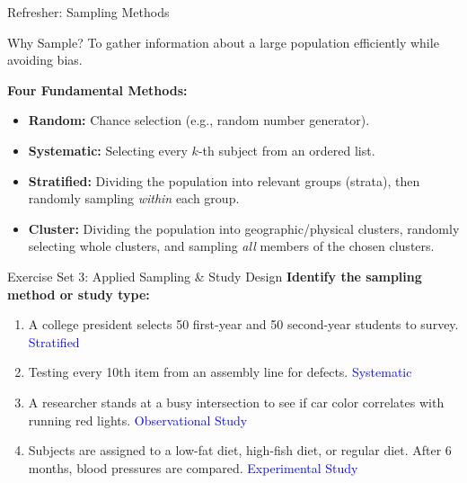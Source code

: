 \documentclass[aspectratio=169]{beamer}
\begin{document}
\begin{frame}{Refresher: Sampling Methods}
    \begin{alertblock}{Why Sample?}
        To gather information about a large population efficiently while avoiding bias.
    \end{alertblock}
    
    \vspace{0.3cm}
    \textbf{Four Fundamental Methods:}
    \begin{itemize}
        \item \textbf{Random:} Chance selection (e.g., random number generator).
        \item \textbf{Systematic:} Selecting every $k$-th subject from an ordered list.
        \item \textbf{Stratified:} Dividing the population into relevant groups (strata), then randomly sampling \emph{within} each group.
        \item \textbf{Cluster:} Dividing the population into geographic/physical clusters, randomly selecting whole clusters, and sampling \emph{all} members of the chosen clusters.
    \end{itemize}
\end{frame}

\begin{frame}{Exercise Set 3: Applied Sampling \& Study Design}
    \textbf{Identify the sampling method or study type:}
    \vspace{0.3cm}
    \begin{enumerate}
        \item A college president selects 50 first-year and 50 second-year students to survey. \pause \hfill \textcolor{blue}{Stratified}
        \item Testing every 10th item from an assembly line for defects. \pause \hfill \textcolor{blue}{Systematic}
        \item A researcher stands at a busy intersection to see if car color correlates with running red lights. \pause \hfill \textcolor{blue}{Observational Study}
        \item Subjects are assigned to a low-fat diet, high-fish diet, or regular diet. After 6 months, blood pressures are compared. \pause \hfill \textcolor{blue}{Experimental Study}
    \end{enumerate}
\end{frame}
\end{document}
